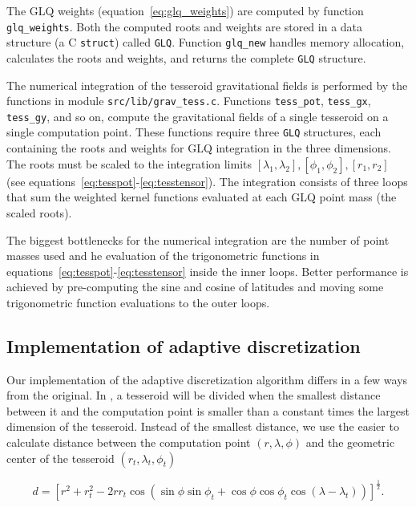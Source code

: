 \documentclass[paper,twocolumn]{geophysics}
\begin{document}
The GLQ weights (equation~\ref{eq:glq_weights})
are computed by function \texttt{glq\_weights}.
Both the computed roots and weights are stored in a data structure
(a C \texttt{struct}) called \texttt{GLQ}.
Function \texttt{glq\_new}
handles memory allocation,
calculates the roots and weights,
and returns the complete \texttt{GLQ} structure.

The numerical integration of the tesseroid gravitational fields
is performed by the functions in module \texttt{src/lib/grav\_tess.c}.
Functions \texttt{tess\_pot}, \texttt{tess\_gx}, \texttt{tess\_gy}, and so on,
compute the gravitational fields of a single tesseroid
on a single computation point.
These functions require three \texttt{GLQ} structures,
each containing the roots and weights
for GLQ integration in the three dimensions.
The roots must be scaled to the
integration limits
$[\lambda_1, \lambda_2], [\phi_1, \phi_2], [r_1, r_2]$
(see equations~\ref{eq:tesspot}-\ref{eq:tesstensor}).
The integration consists of three loops
that sum the weighted kernel functions
evaluated at each GLQ point mass (the scaled roots).

The biggest bottlenecks for the numerical integration are
the number of point masses used
and he evaluation of the trigonometric functions in
equations~\ref{eq:tesspot}-\ref{eq:tesstensor} inside the inner loops.
Better performance is achieved
by pre-computing the sine and cosine of latitudes
and moving some trigonometric function evaluations
to the outer loops.


\subsection{Implementation of adaptive discretization}

Our implementation of the adaptive discretization algorithm
differs in a few ways from the original.
In \citet{Li2011},
a tesseroid will be divided when
the smallest distance between it and the computation point
is smaller than a constant times
the largest dimension of the tesseroid.
Instead of the smallest distance,
we use the easier to calculate
distance between
the computation point $(r, \lambda, \phi)$
and the geometric center of the tesseroid
$(r_t, \lambda_t, \phi_t)$

\begin{equation}
    d = \left[
        r^2 + r_t^2 - 2 r r_t
        \cos(\sin\phi\sin\phi_t + \cos\phi\cos\phi_t
            \cos(\lambda - \lambda_t))
        \right]^{\frac{1}{2}}.
    \label{eq:distance}
\end{equation}
\end{document}
